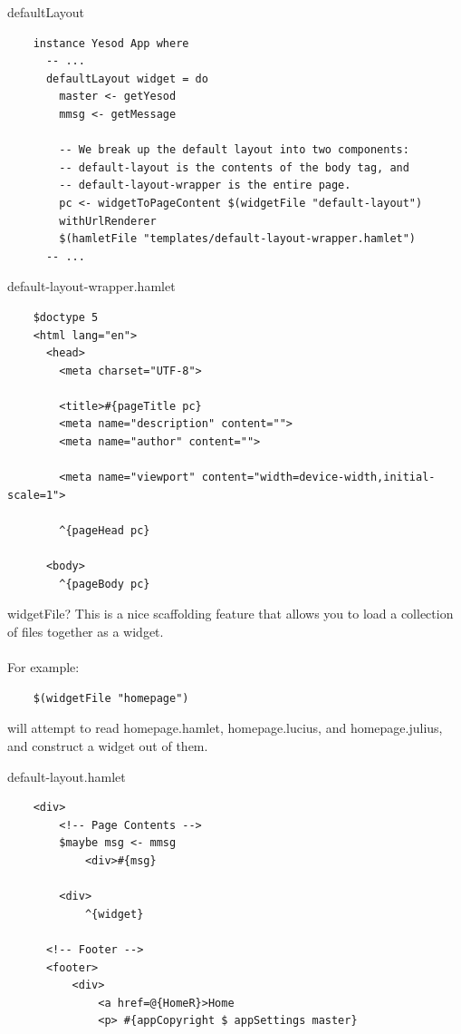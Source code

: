 \documentclass[pdf]{beamer}
\begin{document}
\begin{frame}[fragile]{defaultLayout}
  \begin{verbatim}
    instance Yesod App where
      -- ...
      defaultLayout widget = do
        master <- getYesod
        mmsg <- getMessage

        -- We break up the default layout into two components:
        -- default-layout is the contents of the body tag, and
        -- default-layout-wrapper is the entire page.
        pc <- widgetToPageContent $(widgetFile "default-layout")
        withUrlRenderer
        $(hamletFile "templates/default-layout-wrapper.hamlet")
      -- ...
  \end{verbatim}
\end{frame}

\begin{frame}[fragile]{default-layout-wrapper.hamlet}
  \begin{verbatim}
    $doctype 5
    <html lang="en">
      <head>
        <meta charset="UTF-8">

        <title>#{pageTitle pc}
        <meta name="description" content="">
        <meta name="author" content="">

        <meta name="viewport" content="width=device-width,initial-scale=1">

        ^{pageHead pc}

      <body>
        ^{pageBody pc}
  \end{verbatim}
\end{frame}

\begin{frame}[fragile]{widgetFile?}
  This is a nice scaffolding feature that allows you to load a
  collection of files together as a widget.\\
  \pause
  \\For example:
  \begin{verbatim}
    $(widgetFile "homepage")
  \end{verbatim}

  will attempt to read homepage.hamlet, homepage.lucius, and
  homepage.julius, and construct a widget out of them.
\end{frame}

\begin{frame}[fragile]{default-layout.hamlet}
  \begin{verbatim}
    <div>
        <!-- Page Contents -->
        $maybe msg <- mmsg
            <div>#{msg}

        <div>
            ^{widget}

      <!-- Footer -->
      <footer>
          <div>
              <a href=@{HomeR}>Home
              <p> #{appCopyright $ appSettings master}
  \end{verbatim}
\end{frame}
\end{document}
